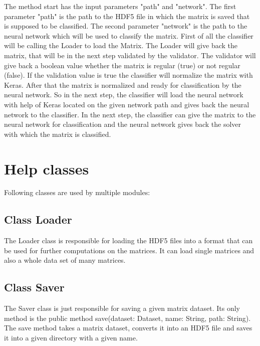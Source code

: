\documentclass[parskip=full]{scrartcl}
\begin{document}
\begin{figure}[h]
\begin{center}

\label{Sequence Diagrams}
\end{center}
\end{figure}

\newpage
The method start has the input parameters "path" and "network".
The first parameter "path" is the path to the \gls{HDF5} file in which the matrix is saved that is supposed to be classified.
The second parameter "network" is the path to the \gls{neural network} which will be used to classify the matrix.
First of all the classifier will be calling the Loader to load the Matrix.
The Loader will give back the matrix, that will be in the next step validated by the validator. 
The validator will give back a boolean value whether the matrix is regular (true) or not regular (false).
If the validation value is true the classifier will normalize the matrix with Keras. 
After that the matrix is normalized and ready for classification by the neural network.
So in the next step, the classifier will load the neural network with help of Keras located on the given network path and gives back the neural network to the classifier.
In the next step, the classifier can give the matrix to the neural network for classification and the neural network gives back the  solver with which the matrix is classified.


\newpage
\section{Help classes}
Following classes are used by multiple modules:

\begin{figure}[h]
\begin{center}

\label{Sequence Diagrams}
\end{center}
\end{figure}
\newpage

\subsection{Class Loader}
The Loader class is responsible for loading the \gls{HDF5} files into a format that can be used for further computations on the matrices.
It can load single matrices and also a whole data set of many matrices.
\subsection{Class Saver}
The Saver class is just responsible for saving a given matrix dataset.
Its only method is the public method save(dataset: Dataset, name: String, path: String).
The save method takes a matrix dataset, converts it into an \gls{HDF5} file and saves it into a given directory with a given name.
\end{document}
